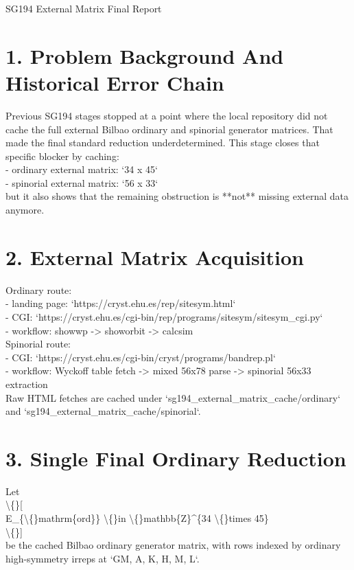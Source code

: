 \documentclass[11pt]{article}
\begin{document}
        \begin{center}
        {\LARGE SG194 External Matrix Final Report}
        \end{center}
        \section*{1. Problem Background And Historical Error Chain}

Previous SG194 stages stopped at a point where the local repository did not cache the full external Bilbao ordinary and spinorial generator matrices. That made the final standard reduction underdetermined. This stage closes that specific blocker by caching:\\

- ordinary external matrix: `34 x 45`\\
- spinorial external matrix: `56 x 33`\\

but it also shows that the remaining obstruction is **not** missing external data anymore.\\

\section*{2. External Matrix Acquisition}

Ordinary route:\\
- landing page: `https://cryst.ehu.es/rep/sitesym.html`\\
- CGI: `https://cryst.ehu.es/cgi-bin/rep/programs/sitesym/sitesym\_cgi.py`\\
- workflow: showwp -> showorbit -> calcsim\\

Spinorial route:\\
- CGI: `https://cryst.ehu.es/cgi-bin/cryst/programs/bandrep.pl`\\
- workflow: Wyckoff table fetch -> mixed 56x78 parse -> spinorial 56x33 extraction\\

Raw HTML fetches are cached under `sg194\_external\_matrix\_cache/ordinary` and `sg194\_external\_matrix\_cache/spinorial`.\\

\section*{3. Single Final Ordinary Reduction}

Let\\
\textbackslash\{\}[\\
E\_\{\textbackslash\{\}mathrm\{ord\}\} \textbackslash\{\}in \textbackslash\{\}mathbb\{Z\}\textasciicircum{}\{34 \textbackslash\{\}times 45\}\\
\textbackslash\{\}]\\
be the cached Bilbao ordinary generator matrix, with rows indexed by ordinary high-symmetry irreps at `GM, A, K, H, M, L`.\\
\end{document}
